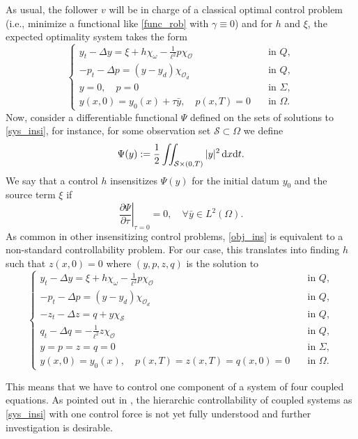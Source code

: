 \documentclass{dcds-bOF}
\theoremstyle{definition}
\def\dx{\,\textnormal{d}x}
\def\dt{\textnormal{d}t}
\begin{document}
\begin{enumerate}
As usual, the follower $v$ will be in charge of a classical optimal control problem (i.e., minimize a functional like \eqref{func_rob} with $\gamma\equiv 0$) and for $h$ and $\xi$, the expected optimality system takes the form
%
\begin{equation}\label{sys_insi}
\begin{cases}
y_t-\Delta y=\xi + h\chi_{\omega}-\frac{1}{\ell^2}p\chi_{\mathcal O} &\quad\text{in }Q, \\
-p_t-\Delta p=(y-y_d)\chi_{\mathcal O_d} &\quad\text{in }Q, \\
y=0, \quad p=0 &\quad\text{in } \Sigma, \\
y(x,0)=y_0(x)+\tau\bar y, \quad p(x,T)=0  &\quad\text{in } \Omega.
\end{cases}
\end{equation}
%
Now, consider a differentiable functional $\Psi$ defined on the sets of solutions to \eqref{sys_insi}, for instance, for some observation set $\mathcal S\subset \Omega$ we define
%
\begin{equation*}
\Psi(y):= \frac{1}{2}\iint_{\mathcal S\times(0,T)}|y|^2\dx\dt.
\end{equation*}
%
We say that a control $h$ insensitizes $\Psi(y)$ for the initial datum $y_0$ and the source term $\xi$ if
%
\begin{equation}\label{obj_ins}
\left.\frac{\partial\Psi}{\partial\tau}\right|_{\tau=0}=0, \quad \forall \bar y\in L^2(\Omega).
\end{equation}
%
As common in other insensitizing control problems, \eqref{obj_ins} is equivalent to a non-standard controllability problem. For our case, this translates into finding $h$ such that $z(x,0)=0$ where $(y,p,z,q)$ is the solution to
%
\begin{equation}\label{sys_insi}
\begin{cases}
y_t-\Delta y=\xi + h\chi_{\omega}-\frac{1}{\ell^2}p\chi_{\mathcal O} &\quad\text{in }Q, \\
-p_t-\Delta p=(y-y_d)\chi_{\mathcal O_d} &\quad\text{in }Q, \\
-z_t-\Delta z= q+y\chi_\mathcal{S} &\quad\text{in }Q, \\
q_t-\Delta q=-\frac{1}{\ell^2}z\chi_{\mathcal O} &\quad\text{in }Q, \\
y= p=z=q=0 &\quad\text{in } \Sigma, \\
y(x,0)=y_0(x), \quad p(x,T)=z(x,T)=q(x,0)=0  &\quad\text{in } \Omega.
\end{cases}
\end{equation}

This means that we have to control one component of a system of four coupled equations. As pointed out in \cite{vhs_honor}, the hierarchic controllability of coupled systems as \eqref{sys_insi} with one control force is not yet fully understood and further investigation is desirable.
\end{enumerate}
\end{document}
